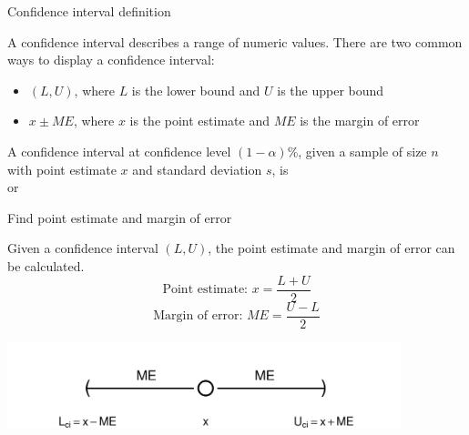 \documentclass[xcolor=table, aspectratio=169, bigger]{beamer}
\begin{document}
\begin{frame}{Confidence interval definition}

\begin{block}{}
A confidence interval describes a range of numeric values. There are two common ways to display a confidence interval:
\begin{itemize}
\item $(L, U)$, where $L$ is the lower bound and $U$ is the upper bound
\item $x \pm ME$, where $x$ is the point estimate and $ME$ is the margin of error
\end{itemize}
\end{block}

\pause
\begin{block}{}
A confidence interval at confidence level $(1-\alpha)$\%, given a sample of size $n$ with point estimate $x$ and standard deviation $s$, is\\ \smallskip
{}
\pause or \\ \smallskip
{}
\end{block}

\end{frame}

\begin{frame}{Find point estimate and margin of error}
\begin{block}{}
Given a confidence interval $(L, U)$, the point estimate and margin of error can be calculated.
\[\text{Point estimate: } x = \frac {L + U}{2}\]
\[\text{Margin of error: } ME = \frac {U - L}{2}\]
\end{block}

\medskip
{\centering
\includegraphics[width=4.5in]{../images/ch7_ci_numline}
\par}

\end{frame}
\end{document}
